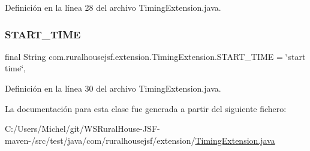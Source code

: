 Definición en la línea 28 del archivo Timing\+Extension.\+java.

\mbox{\label{classcom_1_1ruralhousejsf_1_1extension_1_1_timing_extension_ad283289939c7b6e42277a8b06db6a765}} 
\subsubsection{\texorpdfstring{START\_TIME}{START\_TIME}}
{\footnotesize\ttfamily final String com.\+ruralhousejsf.\+extension.\+Timing\+Extension.\+S\+T\+A\+R\+T\+\_\+\+T\+I\+ME = \char`\"{}start time\char`\"{}\hspace{0.3cm}{\ttfamily [static]}, {\ttfamily [private]}}



Definición en la línea 30 del archivo Timing\+Extension.\+java.



La documentación para esta clase fue generada a partir del siguiente fichero\+:\begin{DoxyCompactItemize}
\item 
C\+:/\+Users/\+Michel/git/\+W\+S\+Rural\+House-\/\+J\+S\+F-\/maven-\//src/test/java/com/ruralhousejsf/extension/\mbox{\hyperlink{_timing_extension_8java}{Timing\+Extension.\+java}}\end{DoxyCompactItemize}
